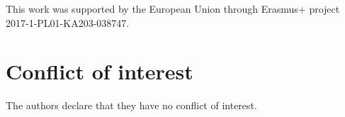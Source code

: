\documentclass[twocolumn]{svjour3}          %
\begin{document}
\begin{acknowledgements}
This work was supported by the European Union through Erasmus+ project
2017-1-PL01-KA203-038747.
\end{acknowledgements}

\section*{Conflict of interest}
The authors declare that they have no conflict of interest.





\end{document}
